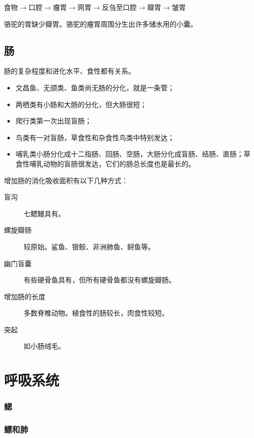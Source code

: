食物$\longrightarrow$口腔$\longrightarrow$瘤胃$\longrightarrow$网胃$\longrightarrow$反刍至口腔$\longrightarrow$瓣胃$\longrightarrow$皱胃

骆驼的胃缺少瓣胃。骆驼的瘤胃周围分生出许多储水用的小囊。

\subsection{肠}

肠的复杂程度和进化水平、食性都有关系。

\begin{itemize}
	\item 文昌鱼、无颌类、鱼类尚无肠的分化，就是一条管；
	\item 两栖类有小肠和大肠的分化，但大肠很短；
	\item 爬行类第一次出现盲肠；
	\item 鸟类有一对盲肠，草食性和杂食性鸟类中特别发达；
	\item 哺乳类小肠分化成十二指肠、回肠、空肠，大肠分化成盲肠、结肠、直肠；草食性哺乳动物的盲肠很发达，它们的肠总长度也是最长的。
\end{itemize}

增加肠的消化吸收面积有以下几种方式：

\begin{description}
	\item[盲沟] 七鳃鳗具有。
	\item[螺旋瓣肠] 较原始。鲨鱼、银鲛、非洲肺鱼、鲟鱼等。
	\item[幽门盲囊] 有些硬骨鱼具有，但所有硬骨鱼都没有螺旋瓣肠。
	\item[增加肠的长度] 多数脊椎动物。植食性的肠较长，肉食性较短。
	\item[突起] 如小肠绒毛。
\end{description}

\section{呼吸系统}

\subsubsection{鳃}



\subsubsection{鳔和肺}

